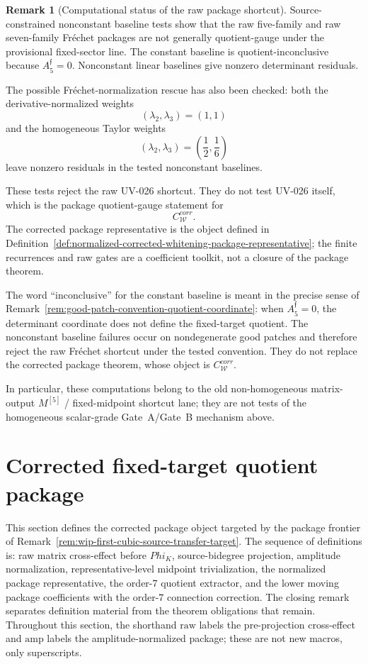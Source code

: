 \documentclass[11pt,a4paper]{amsart}
\def\Phi{Phi}%
\def\corr{corr}%
\theoremstyle{plain}
\theoremstyle{definition}
\newtheorem{remark}[theorem]{Remark}
\newcommand{\corr}{\mathrm{corr}}
\begin{document}
\begin{remark}[Computational status of the raw package shortcut]
\label{rem:computational-status-raw-package}
Source-constrained nonconstant baseline tests show that the raw five-family
and raw seven-family Fr\'echet packages are not generally quotient-gauge
under the provisional fixed-sector line.  The constant baseline is
quotient-inconclusive because \(A_5^{\mathfrak f}=0\).  Nonconstant linear
baselines give nonzero determinant residuals.

The possible Fr\'echet-normalization rescue has also been checked: both the
derivative-normalized weights
\[
(\lambda_2,\lambda_3)=(1,1)
\]
and the homogeneous Taylor weights
\[
(\lambda_2,\lambda_3)=\left(\frac12,\frac16\right)
\]
leave nonzero residuals in the tested nonconstant baselines.

These tests reject the raw UV-026 shortcut.  They do not test UV-026
itself, which is the package quotient-gauge statement for
\[
C_{\mathcal W}^{\corr}.
\]
The corrected package representative is the object defined in
Definition~\ref{def:normalized-corrected-whitening-package-representative};
the finite recurrences and raw gates are a coefficient toolkit, not a
closure of the package theorem.

The word ``inconclusive'' for the constant baseline is meant in the precise
sense of Remark~\ref{rem:good-patch-convention-quotient-coordinate}: when
\(A_5^{\mathfrak f}=0\), the determinant coordinate does not define the
fixed-target quotient.  The nonconstant baseline failures occur on
nondegenerate good patches and therefore reject the raw Fr\'echet shortcut
under the tested convention.  They do not replace the corrected package
theorem, whose object is \(C_{\mathcal W}^{\corr}\).

In particular, these computations belong to the old non-homogeneous
matrix-output \(M^{[5]}\) / fixed-midpoint shortcut lane; they are not
tests of the homogeneous scalar-grade Gate~A/Gate~B mechanism above.
\end{remark}

\section{Corrected fixed-target quotient package}
\label{sec:corrected-fixed-target-quotient-package}

This section defines the corrected package object targeted by the package
frontier of Remark~\ref{rem:wip-first-cubic-source-transfer-target}.  The
sequence of definitions is: raw matrix cross-effect before \(\Phi_K\),
source-bidegree projection, amplitude normalization, representative-level
midpoint trivialization, the normalized package representative, the order-\(7\)
quotient extractor, and the lower moving package coefficients with the
order-\(7\) connection correction.  The closing remark separates definition
material from the theorem obligations that remain.  Throughout this section,
the shorthand \(\mathrm{raw}\) labels the pre-projection cross-effect and
\(\mathrm{amp}\) labels the amplitude-normalized package; these are not
new macros, only superscripts.
\end{document}
